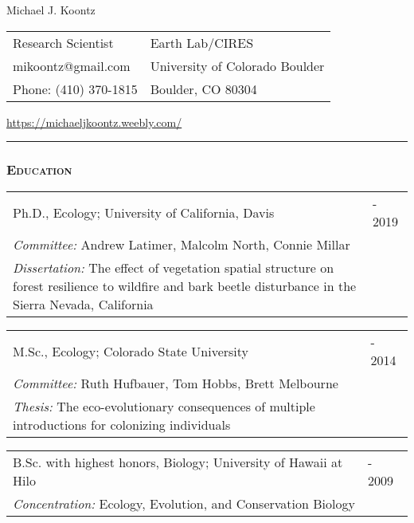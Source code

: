 \documentclass[10pt,english]{article}
\providecommand{\tabularnewline}{\\}
\begin{document}
\begin {center}
{\huge Michael J. Koontz}\tabularnewline
\vspace{1em}

\begin{tabularx}{\textwidth}{@{}>{\raggedright}X >{\raggedleft}X@{}}
Research Scientist & Earth Lab/CIRES \tabularnewline
mikoontz@gmail.com & University of Colorado Boulder \tabularnewline
Phone: (410) 370-1815 & Boulder, CO 80304 
\end{tabularx}

\url{https://michaeljkoontz.weebly.com/}
\end{center}
\vspace{-1.5em}

\rule[0.5ex]{1\linewidth}{0.5pt} 


\vspace{0.5ex}
\subsubsection*{\textsc{Education}}
\vspace{-0.5ex}

\renewcommand{\arraystretch}{1.2}
\begin{tabularx}{\textwidth}{@{}>{\raggedright}p{5.25in} >{\raggedleft}X@{}}
Ph.D., Ecology; University of California, Davis & 2014 - 2019 \tabularnewline
\addtolength{\leftskip}{5ex}\emph{Committee:} Andrew Latimer, Malcolm North, Connie Millar &   \tabularnewline
\addtolength{\leftskip}{5ex}\emph{Dissertation:} The effect of vegetation spatial structure on forest resilience to wildfire and bark beetle disturbance in the Sierra Nevada, California & \tabularnewline
\end{tabularx}

\begin{tabularx}{\textwidth}{@{}>{\raggedright}p{5.25in} >{\raggedleft}X@{}}
M.Sc., Ecology; Colorado State University & 2012 - 2014 \tabularnewline
\addtolength{\leftskip}{5ex}\emph{Committee:} Ruth Hufbauer, Tom Hobbs, Brett Melbourne & \tabularnewline
\addtolength{\leftskip}{5ex}\emph{Thesis:} The eco-evolutionary consequences of multiple introductions for colonizing individuals & \tabularnewline
\end{tabularx}

\begin{tabularx}{\textwidth}{@{}>{\raggedright}p{5.25in} >{\raggedleft}X@{}}
B.Sc. with highest honors, Biology; University of Hawaii at Hilo & 2007 - 2009 \tabularnewline
\addtolength{\leftskip}{5ex}\emph{Concentration:} Ecology, Evolution, and Conservation Biology
\end{tabularx}
\end{document}
